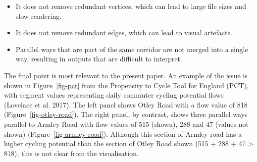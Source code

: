 \documentclass[
  letterpaper,
  DIV=11,
  numbers=noendperiod]{scrartcl}
\providecommand{\tightlist}{%
  \setlength{\itemsep}{0pt}\setlength{\parskip}{0pt}}\usepackage{longtable,booktabs,array}
\begin{document}
\begin{itemize}
\tightlist
\item
  It does not remove redundant vertices, which can lead to large file
  sizes and slow rendering.
\item
  It does not remove redundant edges, which can lead to visual
  artefacts.
\item
  Parallel ways that are part of the same corridor are not merged into a
  single way, resulting in outputs that are difficult to interpret.
\end{itemize}

The final point is most relevant to the present paper. An example of the
issue is shown in Figure~\ref{fig-pct} from the Propensity to Cycle Tool
for England (PCT), with segment values representing daily commuter
cycling potential flows (Lovelace et al. 2017). The left panel shows
Otley Road with a flow value of 818 (Figure~\ref{fig-otley-road}). The
right panel, by contrast, shows three parallel ways parallel to Armley
Road with flow values of 515 (shown), 288 and 47 (values not shown)
(Figure~\ref{fig-armley-road}). Although this section of Armley road has
a higher cycling potential than the section of Otley Road shown (515 +
288 + 47 \textgreater{} 818), this is not clear from the visualisation.
\end{document}
